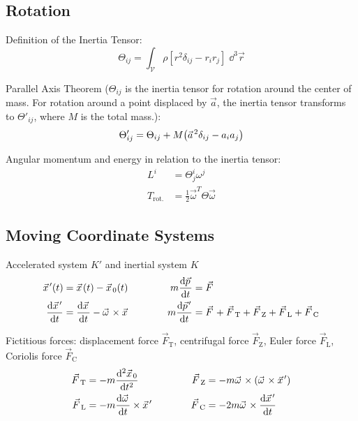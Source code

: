 	\subsection{Rotation}
		\noindent
		Definition of the Inertia Tensor:
		\begin{equation}
			\Theta_{ij}=\int_{\mathcal{V}} \rho \left[r^2\delta_{ij}-r_i r_j\right] \;\dd^3\vec{r}
		\end{equation}

		\noindent
		Parallel Axis Theorem ($\Theta_{ij}$ is the inertia tensor for rotation around the center of mass.
		For rotation around a point displaced by $\vec{a}$, the inertia tensor transforms to $\Theta'_{ij}$, where $M$ is the total mass.):
		\begin{equation}
			\Theta'_{ij} = \Theta_{ij} + M\qty(\vec{a}^2\delta_{ij} - a_i a_j)
		\end{equation}

		\noindent
		Angular momentum and energy in relation to the inertia tensor:
		\begin{equation}
			\begin{aligned}
				L^i &= \Theta^i_j \omega^j \\
				T_{\text{rot.}} &= \frac{1}{2}\vec{\omega}^T \Theta \vec{\omega}
			\end{aligned}
		\end{equation}

	\subsection{Moving Coordinate Systems}
		\noindent
		Accelerated system $K'$ and inertial system $K$
		\begin{equation}
			\begin{aligned}
				\vec{x}'(t) &= \vec{x}(t)-\vec{x}_0(t) &\hsp
				m\dv{\vec{p}}{t} &= \vec{F} \\
				\dv{\vec{x}'}{t} &= \dv{\vec{x}}{t}-\vec{\omega}\times\vec{x} &\hsp
				m\dv{\vec{p}'}{t} &= \vec{F} + \vec{F}_\text{T} + \vec{F}_\text{Z} + \vec{F}_\text{L} + \vec{F}_\text{C} \\
			\end{aligned}
		\end{equation}

		\noindent
		Fictitious forces: displacement force $\vec{F}_\text{T}$, centrifugal force $\vec{F}_\text{Z}$, Euler force $\vec{F}_\text{L}$, Coriolis force $\vec{F}_\text{C}$
		\begin{equation}
			\begin{aligned}
				\vec{F}_\text{T} &= -m\dv[2]{\vec{x}_0}{t} &\hsp
				\vec{F}_\text{Z} &= -m\vec{\omega}\times\qty(\vec{\omega}\times\vec{x}') \\
				\vec{F}_\text{L} &= -m\dv{\vec{\omega}}{t}\times\vec{x}' &\hsp
				\vec{F}_\text{C} &= -2m\vec{\omega}\times\dv{\vec{x}'}{t} \\
			\end{aligned}
		\end{equation}


